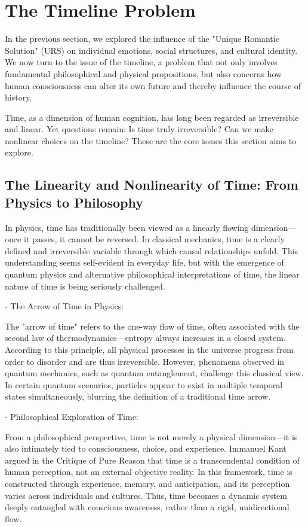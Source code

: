 \documentclass{article}
\begin{document}
\section{The Timeline Problem}

In the previous section, we explored the influence of the "Unique Romantic Solution" (URS) on individual emotions, social structures, and cultural identity. We now turn to the issue of the timeline, a problem that not only involves fundamental philosophical and physical propositions, but also concerns how human consciousness can alter its own future and thereby influence the course of history.

Time, as a dimension of human cognition, has long been regarded as irreversible and linear. Yet questions remain: Is time truly irreversible? Can we make nonlinear choices on the timeline? These are the core issues this section aims to explore.

\subsection{The Linearity and Nonlinearity of Time: From Physics to Philosophy}

In physics, time has traditionally been viewed as a linearly flowing dimension—once it passes, it cannot be reversed. In classical mechanics, time is a clearly defined and irreversible variable through which causal relationships unfold. This understanding seems self-evident in everyday life, but with the emergence of quantum physics and alternative philosophical interpretations of time, the linear nature of time is being seriously challenged.

- The Arrow of Time in Physics:

The "arrow of time" refers to the one-way flow of time, often associated with the second law of thermodynamics—entropy always increases in a closed system. According to this principle, all physical processes in the universe progress from order to disorder and are thus irreversible. However, phenomena observed in quantum mechanics, such as quantum entanglement, challenge this classical view. In certain quantum scenarios, particles appear to exist in multiple temporal states simultaneously, blurring the definition of a traditional time arrow.

- Philosophical Exploration of Time:

From a philosophical perspective, time is not merely a physical dimension—it is also intimately tied to consciousness, choice, and experience. Immanuel Kant argued in the Critique of Pure Reason that time is a transcendental condition of human perception, not an external objective reality. In this framework, time is constructed through experience, memory, and anticipation, and its perception varies across individuals and cultures. Thus, time becomes a dynamic system deeply entangled with conscious awareness, rather than a rigid, unidirectional flow.
\end{document}
